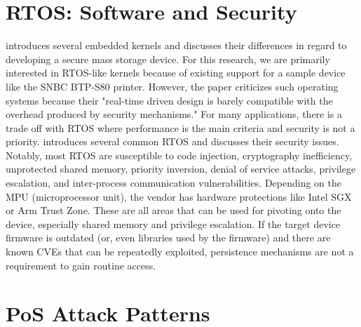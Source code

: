 \section{RTOS: Software and Security}  \label{rtossoftwaresecurity}


\autocite{Benadjila2018WooKeyU} introduces several embedded kernels and discusses their differences in regard to developing a secure mass storage device. For this research, we are primarily interested in RTOS-like kernels because of existing support for a sample device like the SNBC BTP-S80 printer. However, the paper criticizes such operating systems because their "real-time driven design is barely compatible with the overhead produced by security mechanisms." For many applications, there is a trade off with RTOS where performance is the main criteria and security is not a priority. \autocite{yuRealTimeOperatingSystem} introduces several common RTOS and discusses their security issues. Notably, most RTOS are susceptible to code injection, cryptography inefficiency, unprotected shared memory, priority inversion, denial of service attacks, privilege escalation, and inter-process communication vulnerabilities. Depending on the MPU (microprocessor unit), the vendor has hardware protections like Intel SGX or Arm Trust Zone. These are all areas that can be used for pivoting onto the device, especially shared memory and privilege escalation. If the target device firmware is outdated (or, even libraries used by the firmware) and there are known CVEs that can be repeatedly exploited, persistence mechanisms are not a requirement to gain routine access.

\section{PoS Attack Patterns} \label{posattackpatterns}



